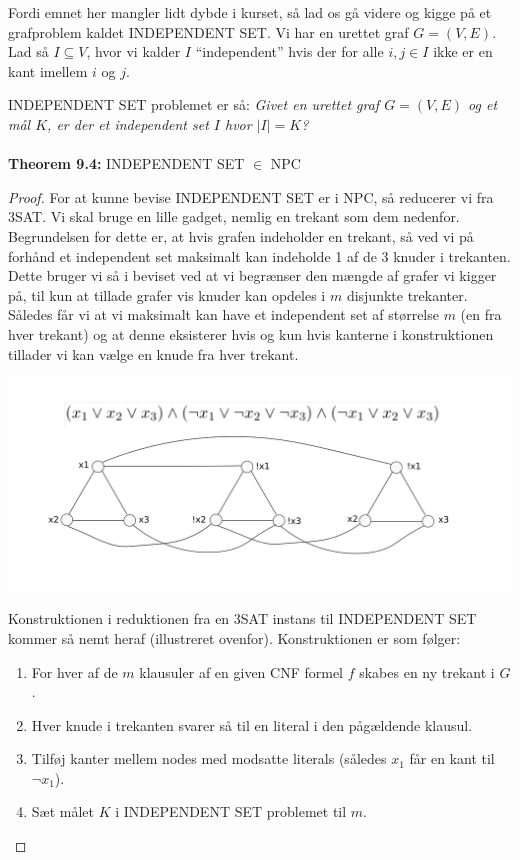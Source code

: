 Fordi emnet her mangler lidt dybde i kurset, så lad os gå videre og kigge på et grafproblem kaldet INDEPENDENT SET. Vi har en urettet graf $G=(V,E)$. Lad så $I \subseteq V$, hvor vi kalder $I$ ``independent'' hvis der for alle $i,j \in I$ ikke er en kant imellem $i$ og $j$. 

INDEPENDENT SET problemet er så: \textit{Givet en urettet graf $G=(V,E)$ og et mål $K$, er der et independent set $I$ hvor $|I|=K$?}\\
~\\
\textbf{Theorem 9.4:} INDEPENDENT SET $\in$ NPC

\begin{proof}
 For at kunne bevise INDEPENDENT SET er i NPC, så reducerer vi fra 3SAT. Vi skal bruge en lille gadget, nemlig en trekant som dem nedenfor. Begrundelsen for dette er, at hvis grafen indeholder en trekant, så ved vi på forhånd et independent set maksimalt kan indeholde 1 af de 3 knuder i trekanten. Dette bruger vi så i beviset ved at vi begrænser den mængde af grafer vi kigger på, til kun at tillade grafer vis knuder kan opdeles i $m$ disjunkte trekanter. Således får vi at vi maksimalt kan have et independent set af størrelse $m$ (en fra hver trekant) og at denne eksisterer hvis og kun hvis kanterne i konstruktionen tillader vi kan vælge en knude fra hver trekant.
 \begin{center}
 \includegraphics[bb=0 0 842 595,scale=0.5]{./INDEPENDENTSET.png}
\end{center}
Konstruktionen i reduktionen fra en 3SAT instans til INDEPENDENT SET kommer så nemt heraf (illustreret ovenfor). Konstruktionen er som følger:

\begin{enumerate}
 \item For hver af de $m$ klausuler af en given CNF formel $f$ skabes en ny trekant i $G$.
 \item Hver knude i trekanten svarer så til en literal i den pågældende klausul.
 \item Tilføj kanter mellem nodes med modsatte literals (således $x_1$ får en kant til $\neg x_1$).
 \item Sæt målet $K$ i INDEPENDENT SET problemet til $m$.
\end{enumerate}


\end{proof}

